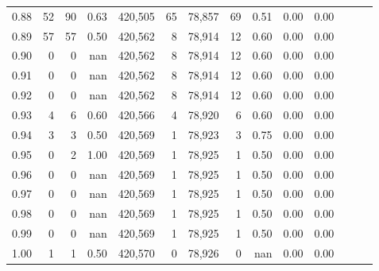 \begin{tabular}{rrrrrrrrrrrrrr}
0.88 &      52 &     90 &  0.63 &  420,505 &       65 &  78,857 &      69 &  0.51 &  0.00 &      0.00 \\
0.89 &      57 &     57 &  0.50 &  420,562 &        8 &  78,914 &      12 &  0.60 &  0.00 &      0.00 \\
0.90 &       0 &      0 &   nan &  420,562 &        8 &  78,914 &      12 &  0.60 &  0.00 &      0.00 \\
0.91 &       0 &      0 &   nan &  420,562 &        8 &  78,914 &      12 &  0.60 &  0.00 &      0.00 \\
0.92 &       0 &      0 &   nan &  420,562 &        8 &  78,914 &      12 &  0.60 &  0.00 &      0.00 \\
0.93 &       4 &      6 &  0.60 &  420,566 &        4 &  78,920 &       6 &  0.60 &  0.00 &      0.00 \\
0.94 &       3 &      3 &  0.50 &  420,569 &        1 &  78,923 &       3 &  0.75 &  0.00 &      0.00 \\
0.95 &       0 &      2 &  1.00 &  420,569 &        1 &  78,925 &       1 &  0.50 &  0.00 &      0.00 \\
0.96 &       0 &      0 &   nan &  420,569 &        1 &  78,925 &       1 &  0.50 &  0.00 &      0.00 \\
0.97 &       0 &      0 &   nan &  420,569 &        1 &  78,925 &       1 &  0.50 &  0.00 &      0.00 \\
0.98 &       0 &      0 &   nan &  420,569 &        1 &  78,925 &       1 &  0.50 &  0.00 &      0.00 \\
0.99 &       0 &      0 &   nan &  420,569 &        1 &  78,925 &       1 &  0.50 &  0.00 &      0.00 \\
1.00 &       1 &      1 &  0.50 &  420,570 &        0 &  78,926 &       0 &   nan &  0.00 &      0.00 \\
\bottomrule
\end{tabular}
